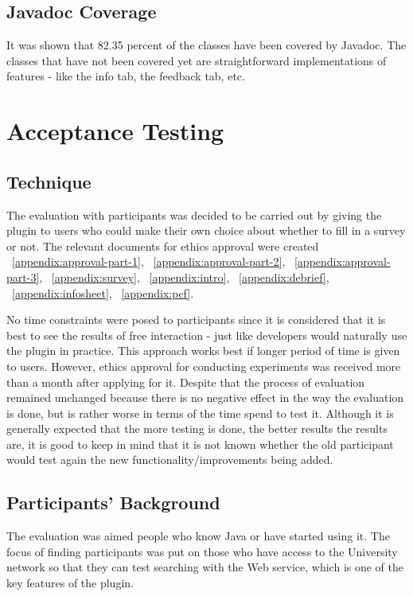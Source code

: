 \documentclass{l4proj}
\begin{document}
\subsection{Javadoc Coverage}
It was shown that 82.35 percent of the classes have been covered by Javadoc. The classes that have not been covered yet are straightforward implementations of features - like the info tab, the feedback tab, etc. 

\section{Acceptance Testing}

\subsection{Technique}

The evaluation with participants was decided to be carried out by giving the plugin to users who could make their own choice about whether to fill in a survey or not. The relevant documents for ethics approval were created  ~\ref{appendix:approval-part-1}, ~\ref{appendix:approval-part-2}, ~\ref{appendix:approval-part-3}, ~\ref{appendix:survey}, ~\ref{appendix:intro}, ~\ref{appendix:debrief}, ~\ref{appendix:infosheet}, ~\ref{appendix:pcf}.

\noindent
No time constraints were posed to participants since it is considered that it is best to see the results of free interaction - just like developers would naturally use the plugin in practice. This approach works best if longer period of time is given to users. However, ethics approval for conducting experiments was received more than a month after applying for it. Despite that the process of evaluation remained unchanged because there is no negative effect in the way the evaluation is done, but is rather worse in terms of the time spend to test it. Although it is generally expected that the more testing is done, the better results the results are, it is good to keep in mind that it is not known whether the old participant would test again the new functionality/improvements being added.

\subsection{Participants' Background}
The evaluation was aimed people who know Java or have started using it. The focus of finding participants was put on those who have access to the University network so that they can test searching with the Web service, which is one of the key features of the plugin. 
\end{document}
